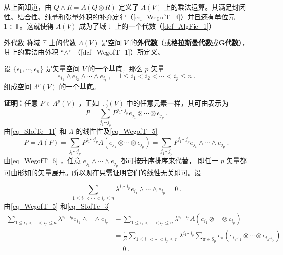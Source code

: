 从上面知道，由 $Q \wedge R=A(Q\otimes R)$ 定义了 $\Lambda(V)$ 上的乘法运算。其满足封闭性、结合性、纯量和张量外积的补充定律（\autoref{eq_WegofT_4}）并且还有单位元 $1\in\mathbb F$。这就使得 $\Lambda(V)$ 成为了域 $\mathbb F$ 上的一个代数（\autoref{def_AlgFie_1}）
\begin{definition}{外代数}
称域 $\mathbb F$ 上的代数 $\Lambda(V)$ 是空间 $V$ 的\textbf{外代数}（或\textbf{格拉斯曼代数}或\textbf{G代数}），其上的乘法由外积 “$\wedge$” （\autoref{def_WegofT_1}）所定义。
\end{definition}
\begin{theorem}{}\label{the_WegofT_1}
设 $\{e_1,\cdots,e_n\}$ 是矢量空间 $V$ 的一个基底，那么 $p$ 矢量
\begin{equation}\label{eq_WegofT_8}
e_{i_1}\wedge e_{i_2}\wedge\cdots\wedge e_{i_p}~,\quad 1\leq i_1<i_2<\cdots<i_p\leq n~.
\end{equation}
组成空间 $\Lambda^p(V)$ 的一个基底。
\end{theorem}
\textbf{证明：}任意 $P\in\Lambda^p(V)$ ，正如 $\mathbb T_0^p(V)$ 中的任意元素一样，其可由表示为
\begin{equation}
P=\sum_{j_1\cdots j_p}P^{j_1\cdots j_p}e_{j_1}\otimes\cdots\otimes e_{j_p}~.
\end{equation}
由\autoref{eq_SIofTe_11}  和 $A$ 的线性性及\autoref{eq_WegofT_5} 
\begin{equation}
P=A(P)=\sum_{j_1\cdots j_p}P^{j_1\cdots j_p}A(e_{j_1}\otimes\cdots\otimes e_{j_p})=\sum_{j_1\cdots j_p}P^{j_1\cdots j_p}e_{j_1}\wedge\cdots\wedge e_{j_p}~.
\end{equation}
由\autoref{eq_WegofT_6}  ，任意 $e_{j_1}\wedge\cdots\wedge e_{j_p}$ 都可按升序排序来代替， 即任一 $p$ 矢量都可由形如的矢量展开。所以现在只需证明它们的线性无关即可。设


\begin{equation}
\sum_{1\leq i_1<\cdots<i_p\leq n} \lambda^{i_1\cdots i_p} e_{i_1}\wedge\cdots\wedge e_{i_p}=0~.
\end{equation}
由\autoref{eq_WegofT_5}  和\autoref{eq_SIofTe_3} 
\begin{equation}\label{eq_WegofT_7}
\begin{aligned}
\sum_{1\leq i_1<\cdots<i_p\leq n} \lambda^{i_1\cdots i_p} e_{i_1}\wedge\cdots\wedge e_{i_p}&=\sum_{1\leq i_1<\cdots<i_p\leq n} \lambda^{i_1\cdots i_p} A(e_{i_1}\otimes\cdots\otimes e_{i_p})\\
&=\frac{1}{p!}\sum_{1\leq i_1<\cdots<i_p\leq n}\lambda^{i_1\cdots i_p}\sum_{\pi\in S_p}\epsilon_\pi(e_{i_{\pi^{-1} 1}}\otimes\cdots\otimes e_{i_{\pi^{-1} p}})\\
&=0~.
\end{aligned}
\end{equation}

